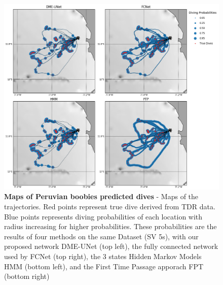 \documentclass{article}
\begin{document}
\begin{figure}[h]
  \centering
  \includegraphics[scale=0.5]{figure4a.png}
  \caption{\textbf{Maps of Peruvian boobies predicted dives} - Maps of the trajectories. Red points represent true dive derived from TDR data. Blue points represents diving probabilities of each location with radius increasing for higher probabilities. These probabilities are the results of four methods on the same Dataset (SV 5s), with our proposed network DME-UNet (top left), the fully connected network used by \citep{browning_predicting_2018}  FCNet (top right), the 3 states Hidden Markov Models HMM (bottom left), and the First Time Passage apporach FPT (bottom right)}
  \label{figure4a}
\end{figure}
\end{document}
